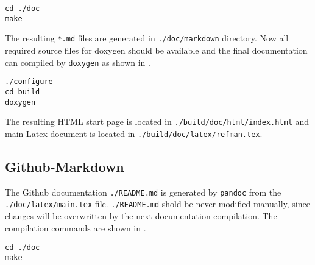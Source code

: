 \begin{lstlisting}[caption={Markdown files generation},label={lst:dox:doxy-markdown}]
cd ./doc
make
\end{lstlisting}

The resulting \lstinline|*.md| files are generated in \lstinline|./doc/markdown| directory.
Now all required source files for doxygen should be available and the final documentation can compiled by \lstinline|doxygen| as shown in .

\begin{lstlisting}[caption={Make HTML and Latex documents},label={lst:doc:doxygen}]
./configure
cd build
doxygen
\end{lstlisting}

The resulting HTML start page is located in \lstinline|./build/doc/html/index.html| and main Latex document is located in \lstinline|./build/doc/latex/refman.tex|.

\subsection{Github-Markdown}
The Github documentation \lstinline|./README.md| is generated by \lstinline|pandoc| from the \lstinline|./doc/latex/main.tex| file.
\lstinline|./README.md| shold be never modified manually, since changes will be overwritten by the next documentation compilation.
The compilation commands are shown in .

\begin{lstlisting}[caption={Make ./README.md},label={lst:doc:gfm}]
cd ./doc
make
\end{lstlisting}
